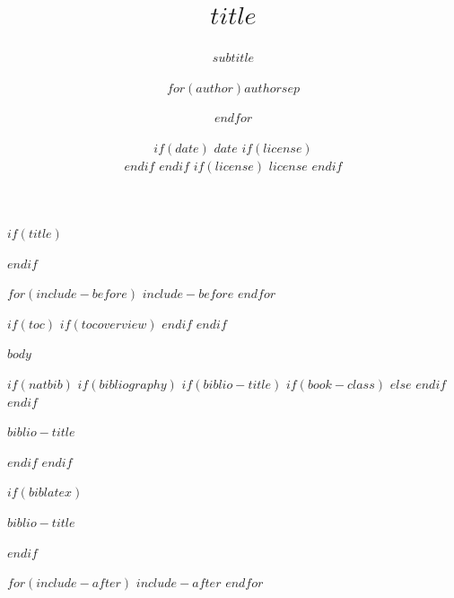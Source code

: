 \documentclass[$if(fontsize)$$fontsize$,$else$10pt,$endif$$if(lang)$$babel-lang$,$endif$$if(handout)$handout,$endif$$if(colorlinks)$dvipsnames,$endif$$if(beamer)$ignorenonframetext,$endif$$for(classoption)$$classoption$$sep$,$endfor$]{$documentclass$}
\title[$shorttitle$]{$title$}
\subtitle{$subtitle$}
\author[
    $if(short-author)$
    $for(short-author)$$short-author$$sep$ \and $endfor$
  $else$
    $for(author)$$author$$sep$ \and $endfor$
  $endif$
  ]{$for(author)$$author$$sep$ \and $endfor$}
\institute[
  $if(short-institute)$
    $for(short-institute)$$short-institute$$sep$ \and $endfor$
  $endif$
  ]{
  $if(department)$
    $for(department)$$department$$sep$ \and $endfor$ \\
  $endif$
  $for(institute)$$institute$$sep$ \and $endfor$
  $if(email)$
    \\ $for(email)$ \href{mailto:$email$}{\nolinkurl{$email$}}$sep$ \and $endfor$
  $endif$
  }
\date[
  $if(short-date)$
    $short-date$
  $else$
    $date$
  $endif$]{
  $if(date)$
    $date$
    $if(license)$
      \\ \vspace{5mm}
    $endif$
  $endif$
  $if(license)$
    {\scriptsize $license$}
  $endif$
}
\newif\ifbibliography
\newcounter{none}
\begin{document}
$if(title)$
  \begin{frame}[plain]
  \titlepage
  \end{frame}
$endif$

$for(include-before)$
  $include-before$
$endfor$

$if(toc)$
  $if(tocoverview)$
  $endif$
$endif$

$body$

$if(natbib)$
  $if(bibliography)$
    $if(biblio-title)$
      $if(book-class)$
        \renewcommand\bibname{$biblio-title$}
        $else$
        \renewcommand\refname{$biblio-title$}
      $endif$
    $endif$
    \begin{frame}[allowframebreaks]{$biblio-title$}
    \bibliographytrue
    
    \end{frame}
  $endif$
$endif$

$if(biblatex)$
  \begin{frame}[allowframebreaks]{$biblio-title$}
  \bibliographytrue
  \printbibliography[heading=none]
  \end{frame}
$endif$

$for(include-after)$
  $include-after$
$endfor$
\end{document}
